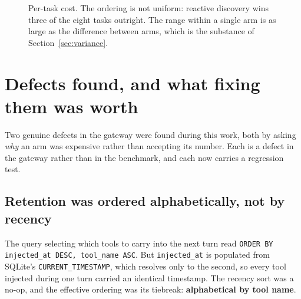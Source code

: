 \documentclass[11pt,a4paper]{article}
\begin{document}
\begin{figure}[h]
\centering
{}
\caption{Per-task cost. The ordering is not uniform: reactive discovery wins three of the eight tasks
outright. The range within a single arm is as large as the difference between arms, which is the
substance of Section~\ref{sec:variance}.}
\label{fig:pertask}
\end{figure}

\section{Defects found, and what fixing them was worth}
\label{sec:defects}

Two genuine defects in the gateway were found during this work, both by asking \emph{why} an arm was
expensive rather than accepting its number. Each is a defect in the gateway rather than in the
benchmark, and each now carries a regression test.

\subsection{Retention was ordered alphabetically, not by recency}

The query selecting which tools to carry into the next turn read
\texttt{ORDER BY injected\_at DESC, tool\_name ASC}. But \texttt{injected\_at} is populated from
SQLite's \texttt{CURRENT\_TIMESTAMP}, which resolves only to the second, so every tool injected
during one turn carried an identical timestamp. The recency sort was a no-op, and the effective
ordering was its tiebreak: \textbf{alphabetical by tool name}.
\end{document}
